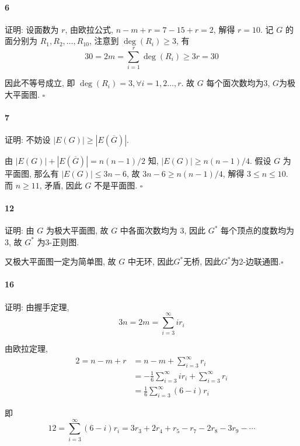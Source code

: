 \documentclass{ctexart}
\def\QED{\hfill $\square$}
\begin{document}
\paragraph*{6} 证明: 设面数为 $r$, 由欧拉公式, $n-m+r=7-15+r=2$,
解得 $r=10$. 记 $G$ 的面分别为 $R_1,R_2,\ldots,R_{10}$,
注意到 $\deg(R_i)\ge 3$, 有
\begin{equation*}
    30 = 2m = \sum_{i=1}^r\deg(R_i) \ge 3r = 30
\end{equation*}

因此不等号成立, 即 $\deg(R_i)=3, \forall i=1,2\ldots,r$.
故 $G$ 每个面次数均为3, $G$为极大平面图. \QED

\paragraph*{7} 证明: 不妨设 $|E(G)|\ge |E(\overline{G})|$.

由 $|E(G)|+|E(\overline{G})| = n(n-1)/2$ 知, $|E(G)|\ge n(n-1)/4$.
假设 $G$ 为平面图, 那么有 $|E(G)|\le 3n-6$,
故 $3n-6\ge n(n-1)/4$, 解得 $3\le n\le 10$.
而 $n\ge 11$, 矛盾, 因此 $G$ 不是平面图. \QED

\paragraph*{12} 证明: 由 $G$ 为极大平面图, 故 $G$ 中各面次数均为 3,
因此 $G^*$ 每个顶点的度数均为 3, 故 $G^*$ 为3-正则图.

又极大平面图一定为简单图, 故 $G$ 中无环, 因此$G^*$无桥, 因此$G^*$为2-边联通图.\QED

\paragraph*{16} 证明: 由握手定理,
\begin{equation*}
    3n = 2m = \sum_{i=3}^{\infty} i r_i
\end{equation*}

由欧拉定理,
\begin{align*}
    2 = n-m+r & = n-m + \sum_{i=3}^{\infty} r_i                                  \\
              & = -\frac{1}{6}\sum_{i=3}^{\infty} i r_i+ \sum_{i=3}^{\infty} r_i \\
              & =\frac{1}{6}\sum_{i=3}^{\infty} (6-i)r_i
\end{align*}

即
\begin{equation*}
    12 = \sum_{i=3}^{\infty} (6-i)r_i = 3r_3+2r_4+r_5 - r_7 - 2r_8 - 3r_9 - \cdots
\end{equation*}
\end{document}
